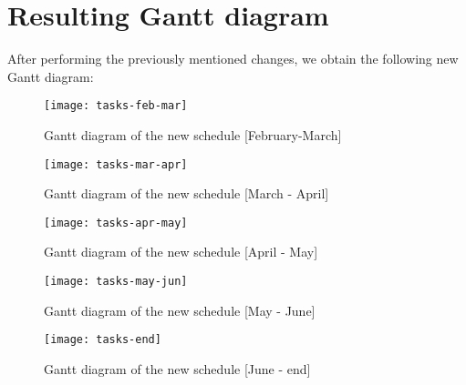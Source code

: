\section{Resulting Gantt diagram}
After performing the previously mentioned changes, we obtain the following new Gantt diagram:
\begin{figure}[ht]
  \centering
  \texttt{[image: tasks-feb-mar]}
  \caption{Gantt diagram of the new schedule [February-March]}
  \label{fig:gantt-diagram-feb-mar}
\end{figure}
\begin{figure}[ht]
  \centering
  \texttt{[image: tasks-mar-apr]}
  \caption{Gantt diagram of the new schedule [March - April]}
  \label{fig:gantt-diagram-mar-apr}
\end{figure}
\begin{figure}[ht]
  \centering
  \texttt{[image: tasks-apr-may]}
  \caption{Gantt diagram of the new schedule [April - May]}
  \label{fig:gantt-diagram-apr-may}
\end{figure}
\begin{figure}[ht]
  \centering
  \texttt{[image: tasks-may-jun]}
  \caption{Gantt diagram of the new schedule [May - June]}
  \label{fig:gantt-diagram-may-jun}
\end{figure}
\begin{figure}[ht]
  \centering
  \texttt{[image: tasks-end]}
  \caption{Gantt diagram of the new schedule [June - end]}
  \label{fig:gantt-diagram-end}
\end{figure}